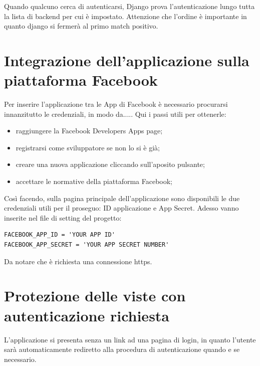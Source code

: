 
Quando qualcuno cerca di autenticarsi, Django prova l'autenticazione lungo tutta la lista di backend per cui è impostato. 
Attenzione che l'ordine è importante in quanto django si fermerà al primo match positivo.


\section{Integrazione dell'applicazione sulla piattaforma Facebook}
Per inserire l'applicazione tra le App di Facebook è necessario procurarsi innanzitutto le credenziali, in modo da.....
Qui i passi utili per ottenerle:
\begin{itemize}
	\item raggiungere la Facebook Developers Apps page;
	\item registrarsi come sviluppatore se non lo si è già;
	\item creare una nuova applicazione cliccando sull'aposito pulsante;
	\item accettare le normative della piattaforma Facebook;
\end{itemize}
Così facendo, sulla pagina principale dell'applicazione sono disponibili le due credenziali utili per il proseguo: ID applicazione e App Secret.
Adesso vanno inserite nel file di setting del progetto:

\begin{lstlisting}
FACEBOOK_APP_ID = 'YOUR APP ID'
FACEBOOK_APP_SECRET = 'YOUR APP SECRET NUMBER'
\end{lstlisting}


Da notare che è richiesta una connessione https.

\section{Protezione delle viste con autenticazione richiesta}
L'applicazione si presenta senza un link ad una pagina di login, in quanto l'utente sarà automaticamente rediretto alla procedura di autenticazione quando e se necessario. 

